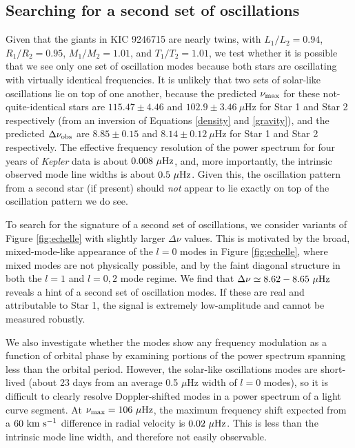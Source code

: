\subsection{Searching for a second set of oscillations}\label{search}

Given that the giants in KIC 9246715 are nearly twins, with $L_1/L_2 = 0.94$, $R_1/R_2 = 0.95$, $M_1/M_2 = 1.01$, and $T_1/T_2 = 1.01$, we test whether it is possible that we see only one set of oscillation modes because both stars are oscillating with virtually identical frequencies. It is unlikely that two sets of solar-like oscillations lie on top of one another, because the predicted $\nu_{\rm{max}}$ for these not-quite-identical stars are $115.47 \pm 4.46$ and $102.9 \pm 3.46\ \mu$Hz for Star 1 and Star 2 respectively (from an inversion of Equations \ref{density} and \ref{gravity}), and the predicted $\Delta\nu_{\rm{obs}}$ are $8.85 \pm 0.15$ and $8.14 \pm 0.12 \ \mu$Hz for Star 1 and Star 2 respectively. The effective frequency resolution of the power spectrum for four years of \emph{Kepler} data is about $0.008 \ \mu \rm{Hz}$, and, more importantly, the intrinsic observed mode line widths is about $0.5 \ \mu \rm{Hz}$. Given this, the oscillation pattern from a second star (if present) should \emph{not} appear to lie exactly on top of the oscillation pattern we do see.

To search for the signature of a second set of oscillations, we consider variants of Figure \ref{fig:echelle} with slightly larger $\Delta \nu$ values. This is motivated by the broad, mixed-mode-like appearance of the $l=0$ modes in Figure \ref{fig:echelle}, where mixed modes are not physically possible, and by the faint diagonal structure in both the $l=1$ and $l=0,2$ mode regime. We find that $\Delta \nu \simeq 8.62-8.65 \ \mu \rm{Hz}$ reveals a hint of a second set of oscillation modes. If these are real and attributable to Star 1, the signal is extremely low-amplitude and cannot be measured robustly.

We also investigate whether the modes show any frequency modulation as a function of orbital phase by examining portions of the power spectrum spanning less than the orbital period. However, the solar-like oscillations modes are short-lived (about 23 days from an average 0.5 $\mu$Hz width of $l=0$ modes), so it is difficult to clearly resolve Doppler-shifted modes in a power spectrum of a light curve segment. At $\nu_{\rm{max}} = 106 \ \mu \rm{Hz}$, the maximum frequency shift expected from a $60 \ \rm{km} \ \rm{s}^{-1}$ difference in radial velocity is $0.02 \ \mu \rm{Hz}$. This is less than the intrinsic mode line width, and therefore not easily observable.
